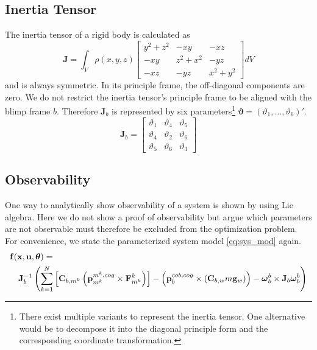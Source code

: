 \subsection{Inertia Tensor}
\label{sub:par_inertia}
The inertia tensor of a rigid body is calculated as
\begin{equation}
\mathbf{J} = \int_V \rho(x,y,z) 
\left[ \begin{array}{ccc}
y^2+z^2 & - xy    & - xz \\
- xy    & z^2+x^2 & - yz \\
- xz    & - yz    & x^2+y^2
\end{array} \right] dV
\end{equation}
and is always symmetric.
In its principle frame, the off-diagonal components are zero.
We do not restrict the inertia tensor's principle frame to be aligned with the blimp frame $b$.
Therefore $\mathbf{J}_b$ is represented by six parameters\footnote{
There exist multiple variants to represent the inertia tensor. One alternative would be to decompose it into the diagonal principle form and the corresponding coordinate transformation.
}
$\boldsymbol{\vartheta} = (\vartheta_1, \hdots, \vartheta_6)'$.
\begin{equation}
\mathbf{J}_b = 
\left[ \begin{array}{ccc}
\vartheta_1 & \vartheta_4 & \vartheta_5 \\
\vartheta_4 & \vartheta_2 & \vartheta_6 \\
\vartheta_5 & \vartheta_6 & \vartheta_3
\end{array} \right]
\end{equation}


\subsection{Observability}
\label{sub:observability}
One way to analytically show observability of a system is shown by \citet{hermann1977} using Lie algebra. 
Here we do not show a proof of observability but argue which parameters are not observable must therefore be excluded from the optimization problem.
\\
For convenience, we state the parameterized system model \cref{eq:sys_mod} again.
\begin{align*}
\lefteqn{ \mathbf{f}(\mathbf{x}, \mathbf{u}, \boldsymbol{\theta}) = {} }\\
& & {} \mathbf{J}_b^{-1} \left( 
\sum_{k=1}^N  \left[  \mathbf{C}_{b,m^k} \left( \mathbf{p}^{m^k,cog}_{m^k} \times \mathbf{F}^k_{m^k} \right)  \right]
-
\left( \mathbf{p}^{cob,cog}_b \times (\mathbf{C}_{b,w}m\mathbf{g}_w) \right)
- \boldsymbol{\omega}_b^b \times \mathbf{J}_b \boldsymbol{\omega}_b^b \right) \nonumber
\end{align*}


